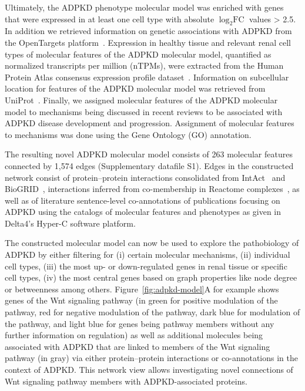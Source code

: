 Ultimately, the ADPKD phenotype molecular model was enriched with genes that were expressed in at least one cell type with absolute $\log_2 \text{FC}$ values > 2.5. In addition we retrieved information on genetic associations with ADPKD from the OpenTargets platform~\citep{bunielloOpenTargetsPlatform2025}. Expression in healthy tissue and relevant renal cell types of molecular features of the ADPKD molecular model, quantified as normalized transcripts per million (nTPMs), were extracted from the Human Protein Atlas consensus expression profile dataset~\citep{karlssonSingleCellType2021}. Information on subcellular location for features of the ADPKD molecular model was retrieved from UniProt~\citep{ahmadUniProtWebsiteAPI2025}. Finally, we assigned molecular features of the ADPKD molecular model to mechanisms being discussed in recent reviews to be associated with ADPKD disease development and progression. Assignment of molecular features to mechanisms was done using the Gene Ontology (GO) annotation.

The resulting novel ADPKD molecular model consists of 263 molecular features connected by 1,574 edges (Supplementary datafile S1). Edges in the constructed network consist of protein--protein interactions consolidated from IntAct~\citep{orchardMIntActProjectIntAct2014} and BioGRID~\citep{oughtredBioGRIDDatabaseComprehensive2021}, interactions inferred from co-membership in Reactome complexes~\citep{ragueneauReactomeKnowledgebase20262026}, as well as of literature sentence-level co-annotations of publications focusing on ADPKD using the catalogs of molecular features and phenotypes as given in Delta4's Hyper-C software platform.

The constructed molecular model can now be used to explore the pathobiology of ADPKD by either filtering for (i) certain molecular mechanisms, (ii) individual cell types, (iii) the most up- or down-regulated genes in renal tissue or specific cell types, (iv) the most central genes based on graph properties like node degree or betweenness among others. Figure~\ref{fig:adpkd-model}A for example shows genes of the Wnt signaling pathway (in green for positive modulation of the pathway, red for negative modulation of the pathway, dark blue for modulation of the pathway, and light blue for genes being pathway members without any further information on regulation) as well as additional molecules being associated with ADPKD that are linked to members of the Wnt signaling pathway (in gray) via either protein--protein interactions or co-annotations in the context of ADPKD. This network view allows investigating novel connections of Wnt signaling pathway members with ADPKD-associated proteins.

